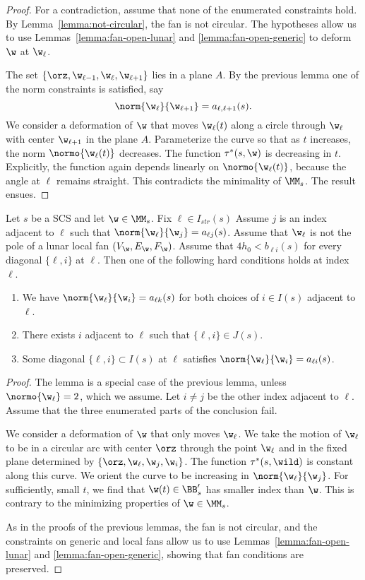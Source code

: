 \begin{proof} 
For a contradiction, assume that none of the enumerated constraints hold.
By Lemma~\ref{lemma:not-circular}, the fan is not circular.
The hypotheses
allow us to use Lemmas~\ref{lemma:fan-open-lunar} and
\ref{lemma:fan-open-generic} to deform $\w$ at $\w_\ell$.

The set $\{\orz,\w_{\ell-1},\w_\ell,\w_{\ell+1}\}$ lies in a plane $A$.
By the previous
lemma one of the norm constraints is satisfied, say
\[
\norm{\w_\ell}{\w_{\ell+1}}=a_{\ell,\ell+1}(s).
\]
We consider a  deformation of $\w$ that moves
 $\w_\ell(t)$ along a circle through
 $\w_\ell$ with center $\w_{\ell+1}$ in the plane $A$.  Parameterize the curve
so that as $t$ increases, the norm $\normo{\w_\ell(t)}$ decreases.
The function $\tau^*(s,\w)$ is decreasing in $t$.  Explicitly, the
function again depends linearly on $\normo{\w_\ell(t)}$, because
the angle at $\ell$ remains straight.  This contradicts the minimality of
$\MM_s$. 
The result ensues.
\end{proof}

\begin{lemma}\label{lemma:nux2}
Let $s$ be a SCS and let $\w\in \MM_s$.   Fix $\ell\in I_{str}(s)$
Assume $j$ is an index adjacent to $\ell$ such  that $\norm{\w_\ell}{\w_j}=a_{\ell j}(s)$.
Assume  that $\w_\ell$ is not the pole of a lunar local fan $(V_\w,E_\w,F_\w)$.
Assume that $4h_0 < b_{\ell i}(s)$ for every diagonal $\{\ell,i\}$ at $\ell$.
Then
one of the following hard conditions holds at index $\ell$.
\begin{enumerate}
\item We have $\norm{\w_\ell}{\w_i}=a_{\ell k}(s)$
for both choices of $i\in I(s)$ adjacent to $\ell$.
\item There exists $i$ adjacent to $\ell$ such that $\{\ell,i\}\in J(s)$.
\item Some diagonal $\{\ell,i\}\subset I(s)$ at $\ell$ satisfies
$\norm{\w_\ell}{\w_i}=a_{\ell i}(s)$.
\end{enumerate}
\end{lemma}

\begin{proof} 
The lemma is a special
case of the previous lemma, unless $\normo{\w_\ell}=2$, which we assume.
Let $i\ne j$ be the other index adjacent to $\ell$.
Assume that the three enumerated parts of the conclusion fail.

We consider a deformation of $\w$ that only moves $\w_\ell$.  We take
the motion of $\w_\ell$ to be
in a circular arc with center $\orz$ through the point $\w_\ell$ and in
the fixed plane determined by $\{\orz,\w_\ell,\w_j,\w_{i}\}$.  
The function $\tau^*(s,\wild)$ is
constant along this curve.  We orient the curve to be increasing
in $\norm{\w_\ell}{\w_{j}}$.  For sufficiently, small $t$, we find that
$\w(t)\in\BB'_s$ has smaller index than $\w$.  This is contrary to the minimizing
properties of $\w\in\MM_s$.

As in the proofs of the previous lemmas, the fan is not circular, and 
the constraints on generic and local fans
allow us to use Lemmas~\ref{lemma:fan-open-lunar} and
\ref{lemma:fan-open-generic}, showing that fan conditions are preserved.
\end{proof}

